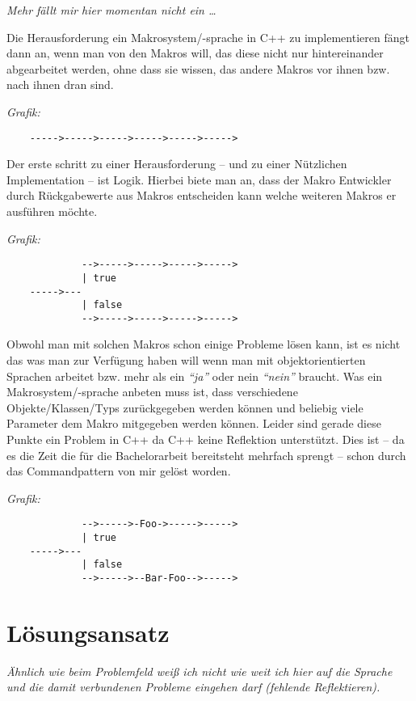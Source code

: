   \textit{%
    \color{DarkSlateGray}%
    Mehr fällt mir hier momentan nicht ein \ldots
  }

  Die Herausforderung ein Makrosystem/-sprache in C++ zu implementieren fängt dann an, wenn man von den Makros will, das diese nicht nur hintereinander abgearbeitet werden, ohne dass sie wissen, das andere Makros vor ihnen bzw. nach ihnen dran sind.

  \textit{%
    \color{DarkSlateGray}%
    Grafik:
  }
  \begin{verbatim}
    ----->----->----->----->----->----->
  \end{verbatim}

  Der erste schritt zu einer Herausforderung -- und zu einer Nützlichen Implementation -- ist Logik. Hierbei biete man an, dass der Makro Entwickler durch Rückgabewerte aus Makros entscheiden kann welche weiteren Makros er ausführen möchte.

  \textit{%
    \color{DarkSlateGray}%
    Grafik:
  }
  \begin{verbatim}
             -->----->----->----->----->
             | true
    ----->---
             | false
             -->----->----->----->----->
  \end{verbatim}

  Obwohl man mit solchen Makros schon einige Probleme lösen kann, ist es nicht das was man zur Verfügung haben will wenn man mit objektorientierten Sprachen arbeitet bzw. mehr als ein \textit{``ja''} oder nein \textit{``nein''} braucht. Was ein Makrosystem/-sprache anbeten muss ist, dass verschiedene Objekte/Klassen/Typs zurückgegeben werden können und beliebig viele Parameter dem Makro mitgegeben werden können. Leider sind gerade diese Punkte ein Problem in C++ da C++ keine Reflektion unterstützt. Dies ist -- da es die Zeit die für die Bachelorarbeit bereitsteht mehrfach sprengt -- schon durch das Commandpattern von mir gelöst worden.

  \textit{%
    \color{DarkSlateGray}%
    Grafik:
  }
  \begin{verbatim}
             -->----->-Foo->----->----->
             | true
    ----->---
             | false
             -->----->--Bar-Foo-->----->
  \end{verbatim}

\section{Lösungsansatz}
\label{sec:loesungsansatz}
  \textit{%
    \color{DarkSlateGray}%
    Ähnlich wie beim Problemfeld weiß ich nicht wie weit ich hier auf die Sprache und die damit verbundenen Probleme eingehen darf (fehlende Reflektieren).
  }

